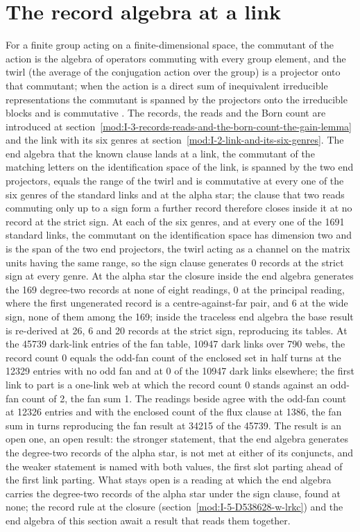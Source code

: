 \section{The record algebra at a link}\label{mod:I-3-D539072-w-calr}
For a finite group acting on a finite-dimensional space, the commutant of the action is the algebra of operators commuting with every group element, and the twirl (the average of the conjugation action over the group) is a projector onto that commutant; when the action is a direct sum of inequivalent irreducible representations the commutant is spanned by the projectors onto the irreducible blocks and is commutative \cite{Schur1905,Weyl1931,Werner1989}. The records, the reads and the Born count are introduced at section~\ref{mod:I-3-records-reads-and-the-born-count-the-gain-lemma} and the link with its six genres at section~\ref{mod:I-2-link-and-its-six-genres}.
The end algebra that the known clause lands at a link, the commutant of the matching letters on the identification space of the link, is spanned by the two end projectors, equals the range of the twirl and is commutative at every one of the six genres of the standard links and at the alpha star; the clause that two reads commuting only up to a sign form a further record therefore closes inside it at no record at the strict sign.
At each of the six genres, and at every one of the 1691 standard links, the commutant on the identification space has dimension two and is the span of the two end projectors, the twirl acting as a channel on the matrix units having the same range, so the sign clause generates 0 records at the strict sign at every genre. At the alpha star the closure inside the end algebra generates the 169 degree-two records at none of eight readings, 0 at the principal reading, where the first ungenerated record is a centre-against-far pair, and 6 at the wide sign, none of them among the 169; inside the traceless end algebra the base result is re-derived at 26, 6 and 20 records at the strict sign, reproducing its tables. At the 45739 dark-link entries of the fan table, 10947 dark links over 790 webs, the record count 0 equals the odd-fan count of the enclosed set in half turns at the 12329 entries with no odd fan and at 0 of the 10947 dark links elsewhere; the first link to part is a one-link web at which the record count 0 stands against an odd-fan count of 2, the fan sum 1. The readings beside agree with the odd-fan count at 12326 entries and with the enclosed count of the flux clause at 1386, the fan sum in turns reproducing the fan result at 34215 of the 45739.
The result is an open one, an open result: the stronger statement, that the end algebra generates the degree-two records of the alpha star, is not met at either of its conjuncts, and the weaker statement is named with both values, the first slot parting ahead of the first link parting.
What stays open is a reading at which the end algebra carries the degree-two records of the alpha star under the sign clause, found at none; the record rule at the closure (section~\ref{mod:I-5-D538628-w-lrkc}) and the end algebra of this section await a result that reads them together.
